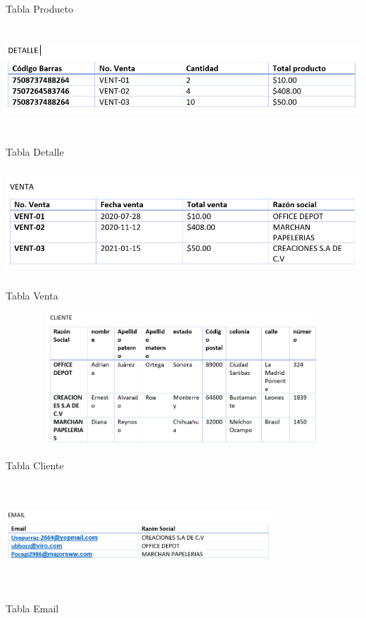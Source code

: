 \documentclass{article}
\begin{document}
{\begin{center}
	   \caption{Tabla Producto}
	     \label{Inter}
	 \end{center}
        \begin{center}
	   \includegraphics[height= 4cm, width=15cm]{detalle.PNG}
	   \caption{Tabla Detalle}
	     \label{Inter}
	 \end{center}
	  \begin{center}
	   \includegraphics[height= 4cm, width=15cm]{venta.PNG}
	   \caption{Tabla Venta}
	     \label{Inter}
	 \end{center}
	 \begin{center}
	   \includegraphics[height= 5cm, width=15cm]{cliente.PNG}
	   \caption{Tabla Cliente}
	     \label{Inter}
	 \end{center}
	  \begin{center}
	   \includegraphics[height= 4cm, width=10cm]{email.PNG}
	   \caption{Tabla Email}
	     \label{Inter}
	 \end{center}
	 }
\end{document}
